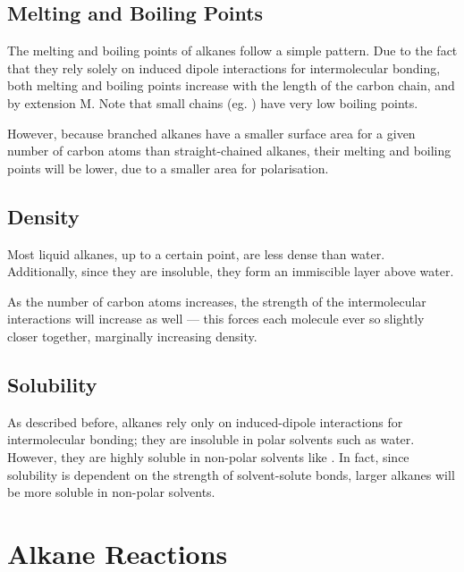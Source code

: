 		\subsection{Melting and Boiling Points}

			The melting and boiling points of alkanes follow a simple pattern. Due to the fact that they rely solely on induced
			dipole interactions for intermolecular bonding, both melting and boiling points increase with the length of the
			carbon chain, and by extension M. Note that small chains (eg. ) have very low boiling points.

			However, because branched alkanes have a smaller surface area for a given number of carbon atoms than straight-chained
			alkanes, their melting and boiling points will be lower, due to a smaller area for polarisation.


		\subsection{Density}

			Most liquid alkanes, up to a certain point, are less dense than water. Additionally, since they are insoluble,
			they form an immiscible layer above water.

			As the number of carbon atoms increases, the strength of the intermolecular interactions will increase as well –– this
			forces each molecule ever so slightly closer together, marginally increasing density.


		\subsection{Solubility}

			As described before, alkanes rely only on induced-dipole interactions for intermolecular bonding; they are insoluble in
			polar solvents such as water. However, they are highly soluble in non-polar solvents like . In fact,
			since solubility is dependent on the strength of solvent-solute bonds, larger alkanes will be more soluble in non-polar solvents.



	\pagebreak
	\section{Alkane Reactions}
